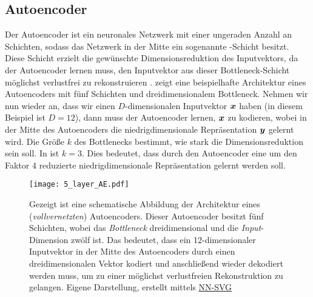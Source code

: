 \subsection{Autoencoder}
\label{ch:MethodenDerDimRed:modern:AE}

Der Autoencoder ist ein neuronales Netzwerk mit einer ungeraden Anzahl an Schichten, sodass das
Netzwerk in der Mitte ein sogenannte -Schicht besitzt. Diese Schicht erzielt die gewünschte
Dimensionsreduktion des Inputvektors, da der Autoencoder lernen muss, den Inputvektor aus dieser
Bottleneck-Schicht möglichst verlustfrei zu rekonstruieren \parencites[502]{Goodfellow.2016}[2]{Bank.2020}.  zeigt eine
beispielhafte Architektur eines Autoencoders mit fünf Schichten und dreidimensionalem Bottleneck.
Nehmen wir nun wieder an, dass wir einen $D$-dimensionalen Inputvektor $\bm{x}$ haben (in diesem
Beispiel ist $D = 12$), dann muss der Autoencoder lernen, $\bm{x}$ zu kodieren, wobei in der
Mitte des Autoencoders die niedrigdimensionale Repräsentation $\bm{y}$ gelernt wird. Die Größe
$k$ des Bottlenecks bestimmt, wie stark die Dimensionsreduktion sein soll. In
 ist $k = 3$. Dies bedeutet, dass durch den Autoencoder eine um den
Faktor 4 reduzierte niedrigdimensionale Repräsentation gelernt werden soll.
\begin{figure}[h]
	\label{fig:5-layer-Autoencoder}
	\begin{center}
		\texttt{[image: 5\_layer\_AE.pdf]}
		\caption[Schematische Abbildung der Architektur eines Autoencoders]{Gezeigt ist eine schematische Abbildung der Architektur eines (\textit{vollvernetzten}) Autoencoders. Dieser Autoencoder besitzt fünf Schichten, wobei das \textit{Bottleneck} dreidimensional und die \textit{Input}-Dimension zwölf ist. Das bedeutet, dass ein 12-dimensionaler Inputvektor in der Mitte des Autoencoders durch einen dreidimensionalen Vektor kodiert und anschließend wieder dekodiert werden muss, um zu einer möglichst verlustfreien Rekonstruktion zu gelangen. Eigene Darstellung, erstellt mittels \href{https://alexlenail.me/NN-SVG/}{NN-SVG}}
	\end{center}
\end{figure}

